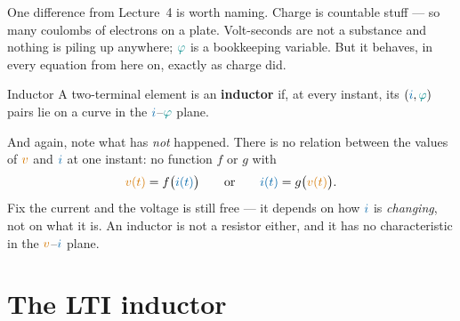 \documentclass[11pt,a4paper]{article}
\newcommand{\Icol}[1]{\textcolor{ccur}{#1}}
\newcommand{\Vcol}[1]{\textcolor{cvolt}{#1}}
\newcommand{\Fcol}[1]{\textcolor{cflux}{#1}}
\newcommand{\iphiaxes}[3]{%
  \draw[vax] (-#1,0) -- (#1,0) node[right=1pt, font=\scriptsize, text=ccur] {$i$};
  \draw[vax] (0,-#2) -- (0,#2) node[above=1pt, font=\scriptsize, text=cflux] {$\varphi$};
  \node[ttl] at (0,-#2-0.68) {#3};}
\begin{document}
One difference from Lecture~4 is worth naming. Charge is countable stuff --- so many
coulombs of electrons on a plate. Volt-seconds are not a substance and nothing is piling
up anywhere; $\Fcol{\varphi}$ is a bookkeeping variable. But it behaves, in every equation
from here on, exactly as charge did.

\begin{definitionbox}{Inductor}
A two-terminal element is an \textbf{inductor} if, at every instant, its
$(\Icol{i},\Fcol{\varphi})$ pairs lie on a curve in the $\Icol{i}$--$\Fcol{\varphi}$ plane.
\end{definitionbox}

\begin{center}
\end{center}
\vspace{2pt}

And again, note what has \emph{not} happened. There is no relation between the values of
$\Vcol{v}$ and $\Icol{i}$ at one instant: no function $f$ or $g$ with
\[
  \Vcol{v(t)} = f\bigl(\Icol{i(t)}\bigr)
  \qquad\text{or}\qquad
  \Icol{i(t)} = g\bigl(\Vcol{v(t)}\bigr) .
\]
Fix the current and the voltage is still free --- it depends on how $\Icol{i}$ is
\emph{changing}, not on what it is. An inductor is not a resistor either, and it has no
characteristic in the $\Vcol{v}$--$\Icol{i}$ plane.

\section{The LTI inductor}
\label{sec:lti}
\end{document}
